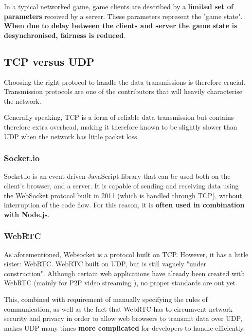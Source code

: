 \documentclass[bsc,frontabs,twoside,singlespacing,parskip,deptreport]{infthesis}     %
\begin{document}
In a typical networked game, game clients are described by a \textbf{limited set of parameters} received by a server. These parameters represent the "game state". \textbf{When due to delay between the clients and server the game state is desynchronised, fairness is reduced}\cite{Fairness_and_Playability}.

\subsection{TCP versus UDP}
Choosing the right protocol to handle the data transmissions is therefore crucial. Transmission protocols are one of the contributors that will heavily characterise the network.
 
Generally speaking, TCP is a form of reliable data transmission but contains therefore extra overhead, making it therefore known to be slightly slower than UDP when the network has little packet loss.

\subsubsection{Socket.io}
Socket.io is an event-driven JavaScript library that can be used both on the client's browser, and a server\cite{Socketio}. It is capable of sending and receiving data using the WebSocket protocol built in 2011 (which is handled through TCP), without interruption of the code flow\cite{Socketio_Benchmark}\cite{Socketio_TCP_Benchmark}. For this reason, it is \textbf{often used in combination with Node.js}.

\subsubsection{WebRTC}
As aforementioned, Websocket is a protocol built on TCP. However, it has a little sister: WebRTC. WebRTC built on UDP, but is still vaguely "under construction"\cite{Browser_Networking}. Although certain web applications have already been created with WebRTC (mainly for P2P video streaming \cite{P2P_Video_Streaming_HTML5_WebRTC}), no proper standards are out yet\cite{Web_Apps_Superior}.

This, combined with requirement of manually specifying the rules of communication, as well as the fact that WebRTC has to circumvent network security and privacy in order to allow web browsers to transmit data over UDP\cite{P2P_Video_Streaming_HTML5_WebRTC}, makes UDP many times \textbf{more complicated} for developers to handle efficiently.
\end{document}
